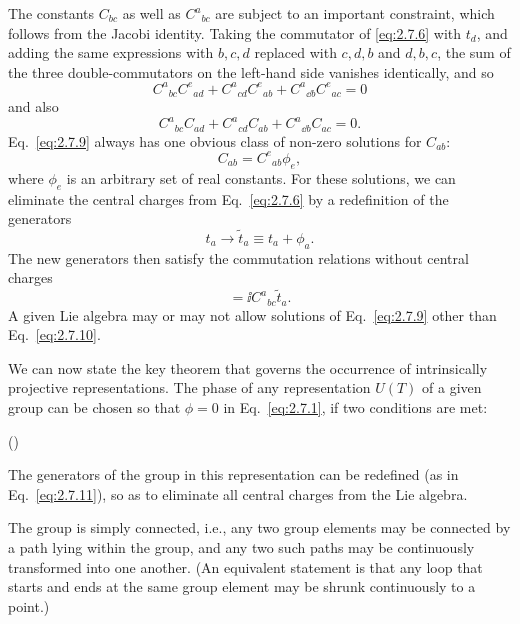 The constants $C_{bc}$ as well as $C^a{}_{bc}$ are subject to an important
constraint, which follows from the Jacobi identity. Taking the commutator of
\eqref{eq:2.7.6} with $t_d$, and adding the same expressions with $b,c,d$ replaced with
$c,d,b$ and $d,b,c$, the sum of the three double-commutators on the left-hand
side vanishes identically, and so
\begin{equation}
  C^a{}_{bc}C^e{}_{ad}+C^a{}_{cd}C^e{}_{ab}
    +C^a{}_{\dd b}C^e{}_{ac}=0
  \tag{2.7.8}\label{eq:2.7.8}
\end{equation}
and also
\begin{equation}
  C^a{}_{bc}C_{ad}+C^a{}_{cd}C_{ab}+C^a{}_{\dd b}C_{ac}=0.
  \tag{2.7.9}\label{eq:2.7.9}
\end{equation}
Eq.~\eqref{eq:2.7.9} always has one obvious class of non-zero solutions for $C_{ab}$:
\begin{equation}
  C_{ab}=C^e{}_{ab}\phi_e,
  \tag{2.7.10}\label{eq:2.7.10}
\end{equation}
where $\phi_e$ is an arbitrary set of real constants. For these solutions, we
can eliminate the central charges from Eq.~\eqref{eq:2.7.6} by a redefinition of the
generators
\begin{equation}
  t_a\longrightarrow\widetilde t_a\equiv t_a+\phi_a.
  \tag{2.7.11}\label{eq:2.7.11}
\end{equation}
The new generators then satisfy the commutation relations without central
charges
\begin{equation}
  [\widetilde t_b,\widetilde t_c]
    =\ii C^a{}_{bc}\widetilde t_a.
  \tag{2.7.12}\label{eq:2.7.12}
\end{equation}
A given Lie algebra may or may not allow solutions of Eq.~\eqref{eq:2.7.9} other than
Eq.~\eqref{eq:2.7.10}.

We can now state the key theorem that governs the occurrence of intrinsically
projective representations. The phase of any representation $U(T)$ of a given
group can be chosen so that $\phi=0$ in Eq.~\eqref{eq:2.7.1}, if two conditions are met:

\begin{list}{()}{\setlength{\leftmargin}{2.3em}}
\item The generators of the group in this representation can be redefined (as
in Eq.~\eqref{eq:2.7.11}), so as to eliminate all central charges from the Lie algebra.

\item The group is simply connected, i.e., any two group elements may be
connected by a path lying within the group, and any two such paths may be
continuously transformed into one another. (An equivalent statement is that
any loop that starts and ends at the same group element may be shrunk
continuously to a point.)
\end{list}

